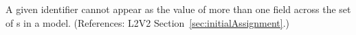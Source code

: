 A given identifier cannot appear as the value of more than one
 field across the set of \InitialAssignment{}s in a model.
(References: L2V2 Section~\ref{sec:initialAssignment}.)
